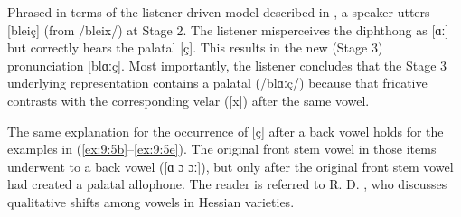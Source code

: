 

Phrased in terms of the listener-driven model described in , a speaker utters [bleiç] (from /bleix/) at Stage 2. The listener misperceives the diphthong as [ɑː] but correctly hears the palatal [ç]. This results in the new (Stage 3) pronunciation [blɑːç]. Most importantly, the listener concludes that the Stage 3 underlying representation contains a palatal (/blɑːç/) because that fricative contrasts with the corresponding velar ([x]) after the same vowel.

The same explanation for the occurrence of [ç] after a back vowel holds for the examples in (\ref{ex:9:5b}--\ref{ex:9:5e}). The original front stem vowel in those items underwent  to a back vowel ([ɑ ɔ ɔː]), but only after the original front stem vowel had created a palatal allophone. The reader is referred to R. D. \citet{Hall1973}, who discusses qualitative shifts among vowels in Hessian varieties.

